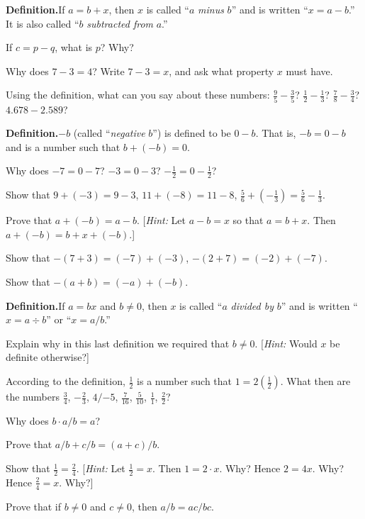 \documentclass[11pt]{book}
\theoremstyle{bkplain}
\begin{document}
\medskip
\noindent\textbf{Definition.}\quad If $a = b + x$, then $x$ is called ``$a$
\emph{minus} $b$'' and is written ``$x = a - b$.'' It is also called ``$b$
\emph{subtracted from} $a$.''

\begin{exlist}
\item If $c = p - q$, what is $p$? Why?
\item Why does $7 - 3 = 4$? Write $7 - 3 = x$, and ask what property $x$ must
      have.
\item Using the definition, what can you say about these numbers:
      $\frac{9}{5} - \frac{3}{5}$? $\frac{1}{2} - \frac{1}{3}$?
      $\frac{7}{8} - \frac{3}{4}$? $4.678 - 2.589$?
\end{exlist}

\medskip
\noindent\textbf{Definition.}\quad $-b$ (called ``\emph{negative} $b$'') is
defined to be $0 - b$. That is, $-b = 0 - b$ and is a number such that
$b + (-b) = 0$.

\begin{exlist}[start=4]
\item Why does $-7 = 0 - 7$? $-3 = 0 - 3$?
      $-\frac{1}{2} = 0 - \frac{1}{2}$?
\item Show that $9 + (-3) = 9 - 3$, $11 + (-8) = 11 - 8$,
      $\frac{5}{6} + (-\frac{1}{3}) = \frac{5}{6} - \frac{1}{3}$.
\item[\stex 6.] Prove that $a + (-b) = a - b$. [\emph{Hint:} Let $a - b = x$ so
      that $a = b + x$. Then $a + (-b) = b + x + (-b)$.]
\item[7.] Show that $-(7 + 3) = (-7) + (-3)$, $-(2 + 7) = (-2) + (-7)$.
\item[8.] Show that $-(a + b) = (-a) + (-b)$.
\end{exlist}

\medskip
\noindent\textbf{Definition.}\quad If $a = bx$ and $b \neq 0$, then $x$ is called
``$a$ \emph{divided by} $b$'' and is written ``$x = a \div b$'' or
``$x = a/b$.''

\begin{exlist}[start=9]
\item Explain why in this last definition we required that $b \neq 0$.
      [\emph{Hint:} Would $x$ be definite otherwise?]
\item According to the definition, $\frac{1}{2}$ is a number such that
      $1 = 2(\frac{1}{2})$. What then are the numbers $\frac{3}{4}$,
      $-\frac{2}{3}$, $4/{-5}$, $\frac{7}{16}$, $\frac{5}{10}$, $\frac{1}{1}$,
      $\frac{2}{2}$?
\item Why does $b \cdot a/b = a$?
\item Prove that $a/b + c/b = (a + c)/b$.
\item Show that $\frac{1}{2} = \frac{2}{4}$. [\emph{Hint:} Let
      $\frac{1}{2} = x$. Then $1 = 2 \cdot x$. Why? Hence $2 = 4x$. Why? Hence
      $\frac{2}{4} = x$. Why?]
\item Prove that if $b \neq 0$ and $c \neq 0$, then $a/b = ac/bc$.
\end{exlist}
\end{document}
